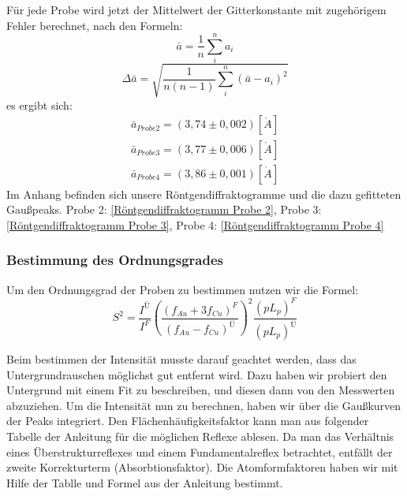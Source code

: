             Für jede Probe wird jetzt der Mittelwert der Gitterkonstante mit zugehörigem
            Fehler berechnet, nach den Formeln:
            \begin{equation}
                \bar{a} = \frac{1}{n} \sum^n_i a_i
            \end{equation}
            \begin{equation}
                \Delta \bar{a} = \sqrt{\frac{1}{n(n-1)} \sum^n_i (\bar{a}-a_i)^2}
            \end{equation}  
            es ergibt sich:
            \begin{align*}
                \bar{a}_{Probe2} = (3,74 \pm 0,002)[\mathring{A}]\\
                \bar{a}_{Probe3} = (3,77 \pm 0,006)[\mathring{A}]\\
                \bar{a}_{Probe4} = (3,86 \pm 0,001)[\mathring{A}]
            \end{align*}
            Im Anhang befinden sich unsere Röntgendiffraktogramme und die dazu gefitteten Gaußpeaks.
            Probe 2: \ref{Röntgendiffraktogramm Probe 2}, Probe 3: \ref{Röntgendiffraktogramm Probe 3}, Probe 4: \ref{Röntgendiffraktogramm Probe 4}

            \subsubsection{Bestimmung des Ordnungsgrades}
                Um den Ordnungsgrad der Proben zu bestimmen nutzen wir die Formel:
                \begin{equation}
                    S^2 = \frac{I^{\text{Ü}}}{I^F}(\frac{(f_{Au}+3f_{Cu})^F}{(f_{Au}-f_{Cu})^{\text{Ü}}})^2 \frac{(pL_p)^F}{(pL_p)^\text{Ü}}
                \end{equation}


                Beim bestimmen der Intensität musste darauf geachtet werden, dass das Untergrundrauschen 
                möglichst gut entfernt wird. Dazu haben wir probiert den Untergrund mit einem 
                Fit zu beschreiben, und diesen dann von den Messwerten abzuziehen. Um die Intensität
                nun zu berechnen, haben wir über die Gaußkurven der Peaks integriert. Den Flächenhäufigkeitsfaktor
                kann man aus folgender Tabelle der Anleitung für die möglichen Reflexe ablesen.
                Da man das Verhältnis eines Überstrukturreflexes und einem Fundamentalreflex betrachtet,
                entfällt der zweite Korrekturterm (Absorbtionsfaktor). Die Atomformfaktoren haben wir 
                mit Hilfe der Tablle und Formel aus der Anleitung bestimmt.

